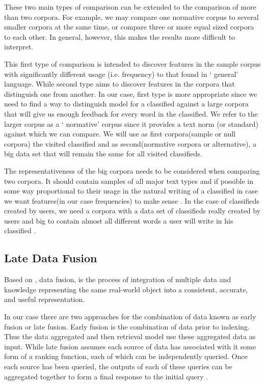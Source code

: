 \documentclass{article}
\begin{document}
These two main types of comparison can be extended to the comparison of more than two corpora. For example, we may compare one normative corpus to several smaller corpora at the same time, or compare three or more equal sized corpora to each other. In general, however, this makes the results more difficult to interpret.

This first type of comparison is intended to discover features in the sample corpus with significantly different usage (i.e. frequency) to that found in ‘ general’ language. While second type aims to discover features in the corpora that distinguish one from another.
In our case, first type is more appropriate since we need to find a way to distinguish model for a classified against a large corpora that will give us enough feedback for every word in the classified. We refer to the larger corpus as a ‘ normative’ corpus since it provides a text norm (or standard) against which we can compare. We will use as first corpora(sample or null corpora) the visited classified and as second(normative corpora or alternative), a big data set that will remain the same for all visited classifieds.

The representativeness of the big corpora needs to be considered when comparing two corpora. It should contain samples of all major text types and if possible in some way proportional to their usage in the natural writing of a classified in case we want features(in our case frequencies) to make sense . In the case of classifieds created by users, we need a corpora with a data set of classifieds really created by users and big to contain almost all different words a user will write in his classified \cite{RaysonGarside}.

\subsection{Late Data Fusion}

Based on \cite{Wilkins}, data fusion, is the process of integration of multiple data and knowledge representing the same real-world object into a consistent, accurate, and useful representation.

In our case there are two approaches for the combination of data known as early fusion or late fusion. Early fusion is the combination of data prior to indexing. Thus the data aggregated and then retrieval model use these aggregated data as input. While late fusion assumes each source of data has associated with it some form of a ranking function, each of which can be independently queried. Once each source has been queried, the outputs of each of these queries can be aggregated together to form a final response to the initial query \cite{WikiDatafusion}.
\end{document}
